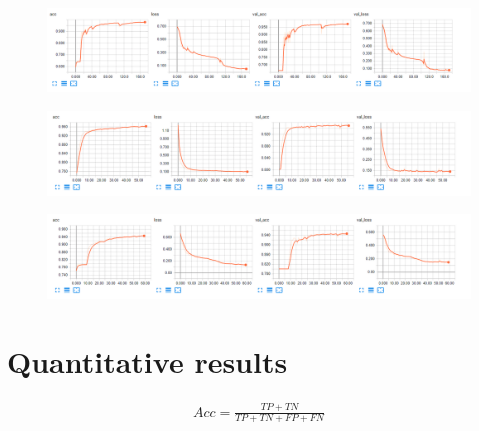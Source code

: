 \documentclass[USenglish]{ifimaster}  %
\begin{document}
\begin{figure}[ht]
    \centering
    \includegraphics[width=1.1\textwidth]{bilder/Custom_1_sequential_training_results.png}
    \label{fig:custom_1_sequential_result}
\end{figure}

\begin{figure}[ht]
    \centering
    \includegraphics[width=1.1\textwidth]{bilder/Custom_2_residual_training_results.png}
    \label{fig:custom_2_residual_result}
\end{figure}

\begin{figure}[ht]
    \centering
    \includegraphics[width=1.1\textwidth]{bilder/Custom_2_sequential_training_results.png}
    \label{fig:custom_2_sequential_result}
\end{figure}

\clearpage

\section{Quantitative results}

\begin{equation}\label{eq:accuracy}
\begin{aligned}
Acc = \frac{TP + TN}{TP + TN + FP + FN}
\end{aligned}
\end{equation}
\end{document}
